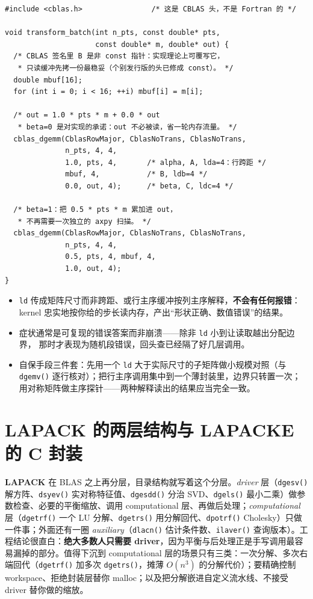 \documentclass[12pt,a4paper,fontset=fandol]{ctexbook}
\newcommand{\Fn}[1]{\texttt{#1()}}
\newcommand{\Tp}[1]{\texttt{#1}}
\newcommand{\Bk}{\allowbreak}
\newcommand{\Lib}[1]{\textbf{#1}}
\begin{document}
\begin{lstlisting}[style=cstyle,caption={C 里用 \Tp{cblas\_dgemm} 做批量齐次变换与加权累加},label={lst:ch04-dgemm}]
#include <cblas.h>                /* 这是 CBLAS 头，不是 Fortran 的 */

void transform_batch(int n_pts, const double* pts,
                     const double* m, double* out) {
  /* CBLAS 签名里 B 是非 const 指针：实现理论上可覆写它，
   * 只读缓冲先拷一份最稳妥（个别发行版的头已修成 const）。 */
  double mbuf[16];
  for (int i = 0; i < 16; ++i) mbuf[i] = m[i];

  /* out = 1.0 * pts * m + 0.0 * out
   * beta=0 是对实现的承诺：out 不必被读，省一轮内存流量。 */
  cblas_dgemm(CblasRowMajor, CblasNoTrans, CblasNoTrans,
              n_pts, 4, 4,
              1.0, pts, 4,       /* alpha, A, lda=4：行跨距 */
              mbuf, 4,           /* B, ldb=4 */
              0.0, out, 4);      /* beta, C, ldc=4 */

  /* beta=1：把 0.5 * pts * m 累加进 out，
   * 不再需要一次独立的 axpy 扫描。 */
  cblas_dgemm(CblasRowMajor, CblasNoTrans, CblasNoTrans,
              n_pts, 4, 4,
              0.5, pts, 4, mbuf, 4,
              1.0, out, 4);
}
\end{lstlisting}

\begin{warning}[title={主序与步长写错不会有任何报错}]
\begin{itemize}
\item \Tp{ld} 传成矩阵尺寸而非跨距、或行主序缓冲按列主序解释，\textbf{不会有任何报错}：
  kernel 忠实地按你给的步长读内存，产出``形状正确、数值错误''的结果。
\item 症状通常是可复现的错误答案而非崩溃——除非 \Tp{ld} 小到让读取越出分配边界，
  那时才表现为随机段错误，回头查已经隔了好几层调用。
\item 自保手段三件套：先用一个 \Tp{ld} 大于实际尺寸的子矩阵做小规模对照（与 \Fn{dgemv} \Bk{}
  逐行核对）；把行主序调用集中到一个薄封装里，边界只转置一次；
  用对称矩阵做主序探针——两种解释读出的结果应当完全一致。
\end{itemize}
\end{warning}

\section{LAPACK 的两层结构与 LAPACKE 的 C 封装}

\Lib{LAPACK} 在 BLAS 之上再分层，目录结构就写着这个分层。\emph{driver} 层（\Fn{dgesv} 解方阵、\Fn{dsyev} 实对称特征值、\Fn{dgesdd} 分治 SVD、\Fn{dgels} 最小二乘）做参数检查、必要的平衡缩放、调用 computational 层、再做后处理；\emph{computational} 层（\Fn{dgetrf} 一个 LU 分解、\Fn{dgetrs} 用分解回代、\Fn{dpotrf} Cholesky）只做一件事；外面还有一圈 \emph{auxiliary}（\Fn{dlacn} 估计条件数、\Fn{ilaver} 查询版本）。工程结论很直白：\textbf{绝大多数人只需要 driver}，因为平衡与后处理正是手写调用最容易漏掉的部分。值得下沉到 computational 层的场景只有三类：一次分解、多次右端回代（\Fn{dgetrf} 加多次 \Fn{dgetrs}，摊薄 $O(n^3)$ 的分解代价）；要精确控制 workspace、拒绝封装层替你 malloc；以及把分解嵌进自定义流水线、不接受 driver 替你做的缩放。
\end{document}
